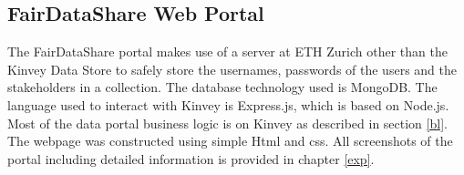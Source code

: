 \subsection{FairDataShare Web Portal}
The FairDataShare portal makes use of a server at ETH Zurich other than the Kinvey Data Store to safely store the usernames, passwords of the users and the stakeholders in a collection. The database technology used is MongoDB. The language used to interact with Kinvey is Express.js, which is based on Node.js. Most of the data portal business logic is on Kinvey as described in section \ref{bl}. The webpage was constructed using simple Html and css. All screenshots of the portal including detailed information is provided in chapter \ref{exp}.









